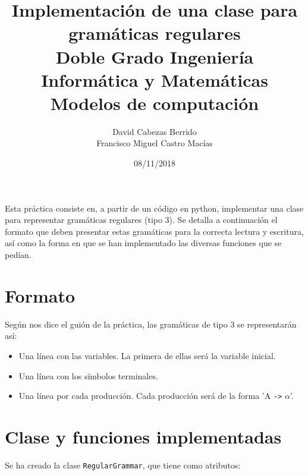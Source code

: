 \documentclass[10pt,a4paper]{article}
\title{
Implementación de una clase para gramáticas regulares \\
\large Doble Grado Ingeniería Informática y Matemáticas \\ Modelos de computación}
\author{
David Cabezas Berrido\\
Francisco Miguel Castro Macías
}
\date{08/11/2018}
\begin{document}
\maketitle

Esta práctica consiste en, a partir de un código en python, implementar una clase para representar gramáticas regulares (tipo 3). Se detalla a continuación el formato que deben presentar estas gramáticas para la correcta lectura y escritura, así como la forma en que se han implementado las diversas funciones que se pedían.\\

\section{Formato}
Según nos dice el guión de la práctica, las gramáticas de tipo 3 se representarán así:
\begin{itemize}
\item Una línea con las variables. La primera de ellas será la variable inicial.
\item Una línea con los símbolos terminales.
\item Una línea por cada producción. Cada producción será de la forma 'A \texttt{->} $\alpha$'.
\end{itemize}

\section{Clase y funciones implementadas}
Se ha creado la clase \texttt{RegularGrammar}, que tiene como atributos:
\end{document}
